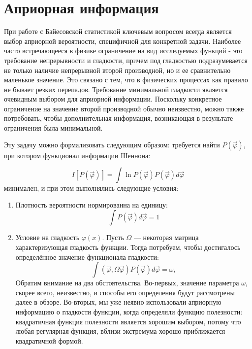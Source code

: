 \section{Априорная информация}

При работе с Байесовской статистикой ключевым вопросом всегда является выбор априорной вероятности, специфичной для конкретной задачи. Наиболее часто встречающееся в физике ограничение на вид исследуемых функций - это требование непрерывности и гладкости, причем под гладкостью подразумевается не только наличие непрерывной второй производной, но и ее сравнительно маленькое значение. Это связано с тем, что в физических процессах как правило не бывает резких перепадов. Требование минимальной гладкости является очевидным выбором для априорной информации. Поскольку конкретное ограничение на значение второй производной обычно неизвестно, можно также потребовать, чтобы дополнительная информация, возникающая в результате ограничения была минимальной.

Эту задачу можно формализовать следующим образом: требуется найти $P(\vec{\varphi})$, при котором функционал информации Шеннона:

\begin{equation}
	\label{eq:inforamation}
	I[P(\vec{\varphi})] = \int \ln{P(\vec{\varphi})} P(\vec{\varphi}) d\vec{\varphi}
\end{equation}
минимален, и при этом выполнялись следующие условия:
\begin{enumerate}
	\item Плотность вероятности нормированна на единицу:
	\begin{equation}
		\int P(\vec{\varphi}) d\vec{\varphi} = 1
	\end{equation}
	
	\item Условие на гладкость $\varphi(x)$. Пусть $\Omega$ --- некоторая матрица характеризующая гладкость функции. Тогда потребуем, чтобы достигалось определённое значение функционала гладкости:
	\begin{equation}
		\label{eq:glad}
		\int (\vec{\varphi},\Omega\vec{\varphi}) P(\vec{\varphi}) d\vec{\varphi} = \omega,
	\end{equation}
	Обратим внимание на два обстоятельства. Во-первых, значение параметра $\omega$, скорее всего, неизвестно, и способы его определения будут рассмотрены далее в обзоре. Во-вторых, мы уже неявно использовали априорную информацию о гладкости функции, когда определяли функцию полезности: квадратичная функция полезности является хорошим выбором, потому что любая регулярная функция, вблизи экстремума хорошо приближается квадратичной формой.
\end{enumerate}

